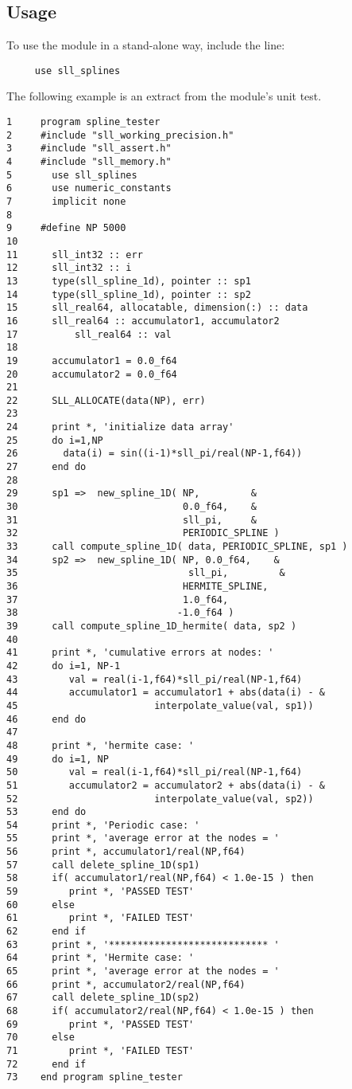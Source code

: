 \documentclass[]{report}   %
\begin{document}
\subsection{Usage}
To use the module in a stand-alone way, include the line:\
\begin{verbatim}
     use sll_splines
\end{verbatim}
The following example is an extract from the module's unit test.
\begin{verbatim}
1     program spline_tester
2     #include "sll_working_precision.h"
3     #include "sll_assert.h"
4     #include "sll_memory.h"
5       use sll_splines
6       use numeric_constants
7       implicit none
8
9     #define NP 5000
10
11      sll_int32 :: err
12      sll_int32 :: i
13      type(sll_spline_1d), pointer :: sp1
14      type(sll_spline_1d), pointer :: sp2
15      sll_real64, allocatable, dimension(:) :: data
16      sll_real64 :: accumulator1, accumulator2
17          sll_real64 :: val
18
19      accumulator1 = 0.0_f64
20      accumulator2 = 0.0_f64
21    
22      SLL_ALLOCATE(data(NP), err)
23 
24      print *, 'initialize data array'
25      do i=1,NP
26        data(i) = sin((i-1)*sll_pi/real(NP-1,f64))
27      end do
28
29      sp1 =>  new_spline_1D( NP,         &
30                             0.0_f64,    &
31                             sll_pi,     &
32                             PERIODIC_SPLINE )
33      call compute_spline_1D( data, PERIODIC_SPLINE, sp1 )
34      sp2 =>  new_spline_1D( NP, 0.0_f64,    &
35	                            sll_pi,         &	
36                             HERMITE_SPLINE, 
37                             1.0_f64, 
38                            -1.0_f64 )
39      call compute_spline_1D_hermite( data, sp2 )
40  
41      print *, 'cumulative errors at nodes: '
42      do i=1, NP-1
43         val = real(i-1,f64)*sll_pi/real(NP-1,f64)
44         accumulator1 = accumulator1 + abs(data(i) - &
45                        interpolate_value(val, sp1))
46      end do
47
48      print *, 'hermite case: '
49      do i=1, NP
50         val = real(i-1,f64)*sll_pi/real(NP-1,f64)
51         accumulator2 = accumulator2 + abs(data(i) - &
52                        interpolate_value(val, sp2))
53      end do
54      print *, 'Periodic case: '
55      print *, 'average error at the nodes = '
56      print *, accumulator1/real(NP,f64)
57      call delete_spline_1D(sp1)
58      if( accumulator1/real(NP,f64) < 1.0e-15 ) then 
59         print *, 'PASSED TEST'
60      else
61         print *, 'FAILED TEST'
62      end if
63      print *, '**************************** '
64      print *, 'Hermite case: '
65      print *, 'average error at the nodes = '
66      print *, accumulator2/real(NP,f64)
67      call delete_spline_1D(sp2)
68      if( accumulator2/real(NP,f64) < 1.0e-15 ) then 
69         print *, 'PASSED TEST'
70      else
71         print *, 'FAILED TEST'
72      end if
73    end program spline_tester
\end{verbatim}
\end{document}
